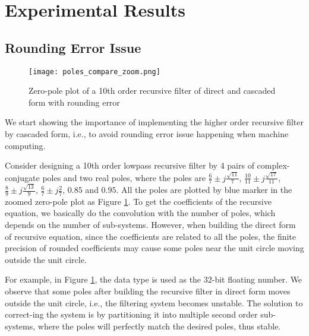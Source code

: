 \section{Experimental Results}
\label{sec:experiment}

\subsection{Rounding Error Issue}

\begin{figure}[t]
    \centerline{\texttt{[image: poles\_compare\_zoom.png]}}
    \caption{Zero-pole plot of a 10th order recursive filter of direct and cascaded form with rounding error}
    \label{fig:poles_compare_zoom}
\end{figure}

We start showing the importance of implementing the higher order recursive filter by cascaded form, i.e.,
to avoid rounding error issue happening when machine computing. 

Consider designing a 10th order lowpass recursive filter by 4 pairs of complex-conjugate poles and two real poles, where the poles are
$\frac{6}{7} \pm j\frac{\sqrt{11}}{7}$, $\frac{10}{11} \pm j\frac{\sqrt{17}}{11}$, $\frac{8}{9} \pm j\frac{\sqrt{13}}{9}$, $\frac{6}{7} \pm j\frac{2}{7}$,
$0.85$ and $0.95$. 
All the poles are plotted by blue marker
in the zoomed zero-pole plot as Figure \ref{fig:poles_compare_zoom}.
To get the coefficients of the recursive equation, we basically do the convolution with the number of poles, which depends on
the number of sub-systems. 
However,
when building the direct form of recursive equation,
since the coefficients are related to all the poles,
the finite precision of rounded coefficients
may cause some poles near the unit circle moving outside the unit circle.

For example, in Figure \ref{fig:poles_compare_zoom}, the data type 
is used as the 32-bit floating number.
We observe that some poles after building the recursive filter in direct form 
moves outside the unit circle, i.e., the filtering system becomes unstable.
The solution to correct-ing the system is by partitioning it into multiple second order
sub-systems, where the poles will perfectly match the desired poles, thus stable.


